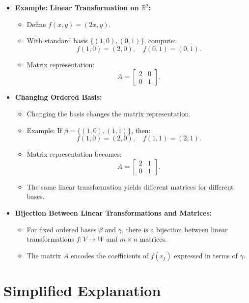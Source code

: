 \documentclass{article}
\begin{document}
\begin{itemize}
  \item \textbf{Example: Linear Transformation on $\mathbb{R}^2$:}
    \begin{itemize}
      \item Define $f(x, y) = (2x, y)$.
      \item With standard basis $\{(1, 0), (0, 1)\}$, compute:
        \[
          f(1, 0) = (2, 0), \quad f(0, 1) = (0, 1).
        \]
      \item Matrix representation:
        \[
          A =
          \begin{bmatrix}
            2 & 0 \\
            0 & 1
          \end{bmatrix}.
        \]
    \end{itemize}

  \item \textbf{Changing Ordered Basis:}
    \begin{itemize}
      \item Changing the basis changes the matrix representation.
      \item Example: If $\beta = \{(1, 0), (1, 1)\}$, then:
        \[
          f(1, 0) = (2, 0), \quad f(1, 1) = (2, 1).
        \]
      \item Matrix representation becomes:
        \[
          A =
          \begin{bmatrix}
            2 & 1 \\
            0 & 1
          \end{bmatrix}.
        \]
      \item The same linear transformation yields different matrices for different bases.
    \end{itemize}

  \item \textbf{Bijection Between Linear Transformations and Matrices:}
    \begin{itemize}
      \item For fixed ordered bases $\beta$ and $\gamma$, there is a bijection between linear transformations $f: V \to W$ and $m \times n$ matrices.
      \item The matrix $A$ encodes the coefficients of $f(v_j)$ expressed in terms of $\gamma$.
    \end{itemize}
\end{itemize}

\section*{Simplified Explanation}
\end{document}
